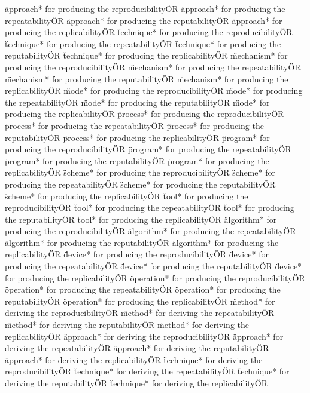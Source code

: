 \documentclass[
10pt, %
a4paper, %
oneside, %
headinclude,footinclude, %
BCOR5mm, %
]{scrartcl}
\begin{document}
\"approach* for producing the reproducibility\" OR \"approach* for producing the repeatability\" OR \"approach* for producing the reputability\" OR \"approach* for producing the replicability\" OR 
\"technique* for producing the reproducibility\" OR \"technique* for producing the repeatability\" OR \"technique* for producing the reputability\" OR \"technique* for producing the replicability\" OR 
\"mechanism* for producing the reproducibility\" OR \"mechanism* for producing the repeatability\" OR \"mechanism* for producing the reputability\" OR \"mechanism* for producing the replicability\" OR 
\"mode* for producing the reproducibility\" OR \"mode* for producing the repeatability\" OR \"mode* for producing the reputability\" OR \"mode* for producing the replicability\" OR 
\"process* for producing the reproducibility\" OR \"process* for producing the repeatability\" OR \"process* for producing the reputability\" OR \"process* for producing the replicability\" OR 
\"program* for producing the reproducibility\" OR \"program* for producing the repeatability\" OR \"program* for producing the reputability\" OR \"program* for producing the replicability\" OR 
\"scheme* for producing the reproducibility\" OR \"scheme* for producing the repeatability\" OR \"scheme* for producing the reputability\" OR \"scheme* for producing the replicability\" OR 
\"tool* for producing the reproducibility\" OR \"tool* for producing the repeatability\" OR \"tool* for producing the reputability\" OR \"tool* for producing the replicability\" OR 
\"algorithm* for producing the reproducibility\" OR \"algorithm* for producing the repeatability\" OR \"algorithm* for producing the reputability\" OR \"algorithm* for producing the replicability\" OR 
\"device* for producing the reproducibility\" OR \"device* for producing the repeatability\" OR \"device* for producing the reputability\" OR \"device* for producing the replicability\" OR 
\"operation* for producing the reproducibility\" OR \"operation* for producing the repeatability\" OR \"operation* for producing the reputability\" OR \"operation* for producing the replicability\" OR 
\"method* for deriving the reproducibility\" OR \"method* for deriving the repeatability\" OR \"method* for deriving the reputability\" OR \"method* for deriving the replicability\" OR 
\"approach* for deriving the reproducibility\" OR \"approach* for deriving the repeatability\" OR \"approach* for deriving the reputability\" OR \"approach* for deriving the replicability\" OR 
\"technique* for deriving the reproducibility\" OR \"technique* for deriving the repeatability\" OR \"technique* for deriving the reputability\" OR \"technique* for deriving the replicability\" OR 
\end{document}
